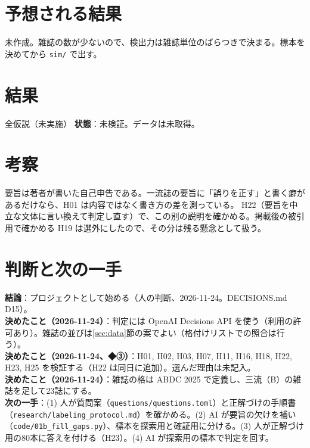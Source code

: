 \documentclass[a4paper,10pt]{ltjsarticle}
\begin{document}
\section{予想される結果}\label{sec:expected}
未作成。雑誌の数が少ないので、検出力は雑誌単位のばらつきで決まる。標本を決めてから \texttt{sim/} で出す。

\section{結果}\label{sec:result}
\begin{result}{全仮説（未実施）}
\textbf{状態}：未検証。データは未取得。
\end{result}

\section{考察}\label{sec:discussion}
\begin{pitfall}
要旨は著者が書いた自己申告である。一流誌の要旨に「誤りを正す」と書く癖があるだけなら、H01 は内容ではなく書き方の差を測っている。
H22（要旨を中立な文体に言い換えて判定し直す）で、この別の説明を確かめる。掲載後の被引用で確かめる H19 は選外にしたので、その分は残る懸念として扱う。
\end{pitfall}

\section{判断と次の一手}\label{sec:decision}
\begin{decision}
\textbf{結論}：プロジェクトとして始める（人の判断、2026-11-24。DECISIONS.md D15）。\\
\textbf{決めたこと（2026-11-24）}：判定には OpenAI Decisions API を使う（利用の許可あり）。雑誌の並びは\ref{sec:data}節の案でよい（格付けリストでの照合は行う）。\\
\textbf{決めたこと（2026-11-24、◆③）}：H01, H02, H03, H07, H11, H16, H18, H22, H23, H25 を検証する（H22 は同日に追加）。選んだ理由は未記入。\\
\textbf{決めたこと（2026-11-24）}：雑誌の格は ABDC 2025 で定義し、三流（B）の雑誌を足して23誌にする。\\
\textbf{次の一手}：(1) 人が質問案（\texttt{questions/questions.toml}）と正解づけの手順書（\texttt{research/labeling\_protocol.md}）を確かめる。(2) AI が要旨の欠けを補い（\texttt{code/01b\_fill\_gaps.py}）、標本を探索用と確証用に分ける。(3) 人が正解づけ用の80本に答えを付ける（H23）。(4) AI が探索用の標本で判定を回す。
\end{decision}
\end{document}

